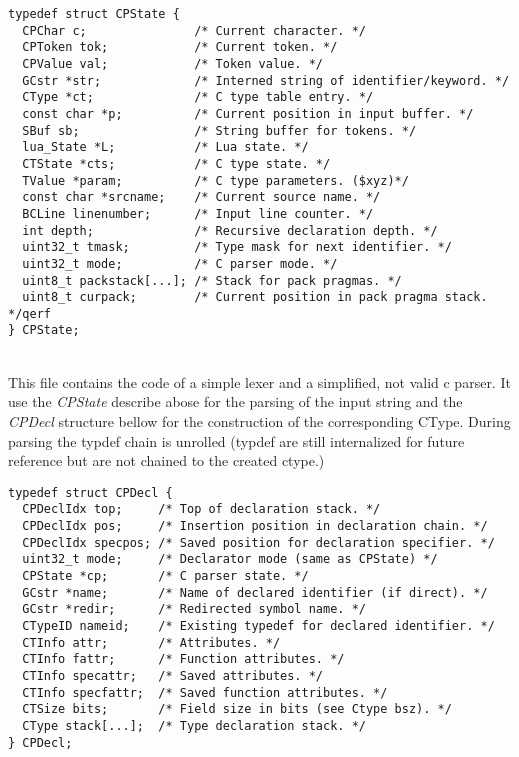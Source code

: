 \begin{adjustbox}{bgcolor=backgroundColour, max width=\textwidth}
\begin{lstlisting}[style=CStyle]
typedef struct CPState {
  CPChar c;               /* Current character. */
  CPToken tok;            /* Current token. */
  CPValue val;            /* Token value. */
  GCstr *str;             /* Interned string of identifier/keyword. */
  CType *ct;              /* C type table entry. */
  const char *p;          /* Current position in input buffer. */
  SBuf sb;                /* String buffer for tokens. */
  lua_State *L;           /* Lua state. */
  CTState *cts;           /* C type state. */
  TValue *param;          /* C type parameters. ($xyz)*/
  const char *srcname;    /* Current source name. */
  BCLine linenumber;      /* Input line counter. */
  int depth;              /* Recursive declaration depth. */
  uint32_t tmask;         /* Type mask for next identifier. */
  uint32_t mode;          /* C parser mode. */
  uint8_t packstack[...]; /* Stack for pack pragmas. */
  uint8_t curpack;        /* Current position in pack pragma stack. */qerf
} CPState;
\end{lstlisting}
\end{adjustbox}

\\
This file contains the code of a simple lexer and a simplified, not valid c
parser. It use the \emph{CPState} describe abose for the parsing of the input
string and the \emph{CPDecl} structure bellow for the construction of the
corresponding CType. During parsing the typdef chain is unrolled (typdef are
still internalized for future reference but are not chained to the created
ctype.)

\begin{lstlisting}[style=CStyle]
typedef struct CPDecl {
  CPDeclIdx top;     /* Top of declaration stack. */
  CPDeclIdx pos;     /* Insertion position in declaration chain. */
  CPDeclIdx specpos; /* Saved position for declaration specifier. */
  uint32_t mode;     /* Declarator mode (same as CPState) */
  CPState *cp;       /* C parser state. */
  GCstr *name;       /* Name of declared identifier (if direct). */
  GCstr *redir;      /* Redirected symbol name. */
  CTypeID nameid;    /* Existing typedef for declared identifier. */
  CTInfo attr;       /* Attributes. */
  CTInfo fattr;      /* Function attributes. */
  CTInfo specattr;   /* Saved attributes. */
  CTInfo specfattr;  /* Saved function attributes. */
  CTSize bits;       /* Field size in bits (see Ctype bsz). */
  CType stack[...];  /* Type declaration stack. */
} CPDecl;
\end{lstlisting}


